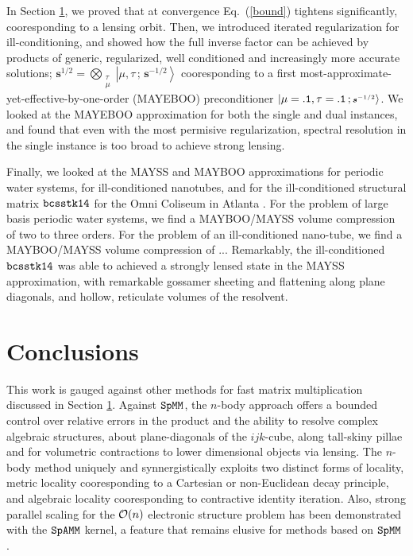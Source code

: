 \documentclass[letterpaper,twocolumn,amsmath,amsfont,amssymb,english,aps,jcp,preprintnumbers,groupaddress,nofootinbib,tightenlines,floatfix]{revtex4}
\newcommand{\mat}[1]{\boldsymbol{#1}}
\theoremstyle{plain}
\theoremstyle{remark}
\theoremstyle{plain}
\begin{document}
In Section \ref{}, we proved that at convergence Eq.~(\ref{bound}) tightens significantly, cooresponding to a lensing orbit. 
Then, we introduced iterated regularization for ill-conditioning, and showed how the full inverse factor can 
be achieved by products of generic, regularized, well conditioned and increasingly more accurate solutions;
$\mat{s}^{1/2} = \bigotimes_{\substack{\tau \\ \mu } }  \left| \mu , \tau \, ;  \, \scriptstyle{\mat{s}^{-1/2}} \right>$
cooresponding to a first most-approximate-yet-effective-by-one-order (MAYEBOO) preconditioner
$ \left| \mu={\tt .1} , \tau = {\tt .1} \, ;  \, \scriptstyle{\mat{s}^{-1/2}} \right>$.   
We looked at the MAYEBOO approximation for both the single and dual instances, and found that even with the most
permisive regularization, spectral resolution in the single instance is too broad to achieve strong lensing.  

Finally, we looked at the MAYSS and MAYBOO approximations for periodic water systems, for ill-conditioned nanotubes, 
and for the ill-conditioned structural matrix ${\tt bcsstk14}$ for the Omni Coliseum in Atlanta \cite{}.  For the
problem of large basis periodic water systems, we find a MAYBOO/MAYSS volume compression of two to three orders. 
For the problem of an ill-conditioned nano-tube, we find a MAYBOO/MAYSS volume compression  of ...    
Remarkably, the ill-conditioned ${\tt bcsstk14}$ was able to achieved a strongly lensed state 
in the  MAYSS approximation, with remarkable gossamer sheeting and flattening along plane diagonals, 
and hollow, reticulate volumes of the resolvent.


\section{Conclusions}

This work is gauged against other methods for fast matrix multiplication discussed in Section \ref{}. 
Against $\tt SpMM$, the $n$-body approach offers a bounded control over relative errors in 
the product and the ability to resolve complex algebraic structures, about plane-diagonals of the $ijk$-cube, 
along tall-skiny pillae and for volumetric contractions to lower dimensional objects via lensing. 
The $n$-body method uniquely and synnergistically exploits two distinct forms of locality, metric locality cooresponding to 
a Cartesian or non-Euclidean decay principle, and algebraic locality cooresponding to contractive identity iteration. 
Also, strong parallel scaling for the ${\cal{O}}(n)$ electronic structure problem has been demonstrated with the $\tt SpAMM$ kernel, 
a feature that remains elusive for methods based on $\tt SpMM$ \cite{Bowler}.
\end{document}
